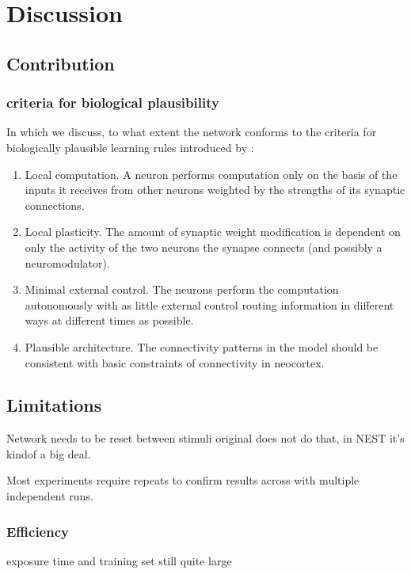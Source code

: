 
\chapter{Discussion}


\section{Contribution}




\subsection{criteria for biological plausibility}

In which we discuss, to what extent the network conforms to the criteria for biologically plausible learning rules
introduced by \cite{Whittington2017}:
\begin{enumerate}
      \item Local computation. A neuron performs computation only on the basis
            of the inputs it receives from other neurons weighted by the strengths
            of its synaptic connections.
      \item  Local plasticity. The amount of synaptic weight modification is dependent on only the activity of the two
            neurons the synapse connects (and possibly a neuromodulator).
      \item  Minimal external control. The neurons perform the computation autonomously with as little external control
            routing information in different ways at different times as possible.
      \item   Plausible architecture. The connectivity patterns in the model should
            be consistent with basic constraints of connectivity in neocortex.
\end{enumerate}








\section{Limitations}

Network needs to be reset between stimuli
original does not do that, in NEST it's kindof a big deal.

Most experiments require repeats to confirm results across with multiple independent runs.


\subsection*{Efficiency}
exposure time and training set still quite large


